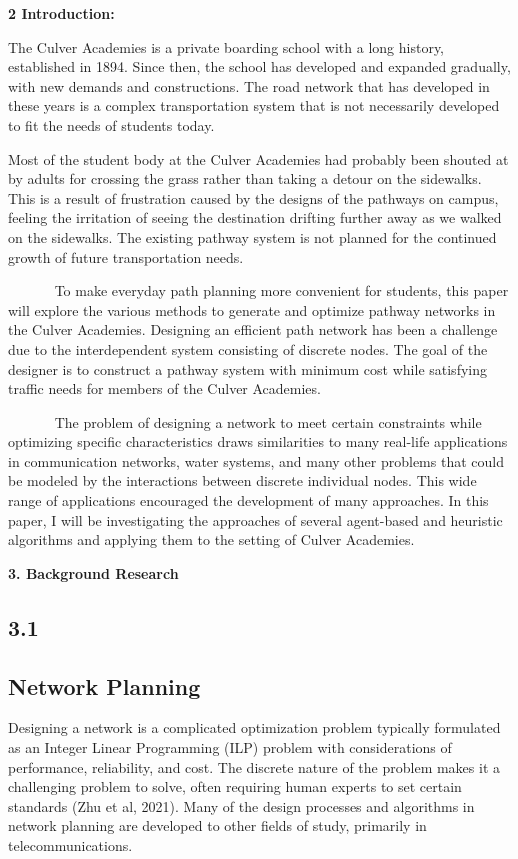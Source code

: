 \documentclass[11pt]{article}
\begin{document}
\textbf{2 Introduction:}

The Culver Academies is a private boarding school with a long history,
established in 1894. Since then, the school has developed and expanded
gradually, with new demands and constructions. The road network that has
developed in these years is a complex transportation system that is not
necessarily developed to fit the needs of students today.

Most of the student body at the Culver Academies had probably been
shouted at by adults for crossing the grass rather than taking a detour
on the sidewalks. This is a result of frustration caused by the designs
of the pathways on campus, feeling the irritation of seeing the
destination drifting further away as we walked on the sidewalks. The
existing pathway system is not planned for the continued growth of
future transportation needs.

~~~~~~ To make everyday path planning more convenient for students, this
paper will explore the various methods to generate and optimize pathway
networks in the Culver Academies. Designing an efficient path network
has been a challenge due to the interdependent system consisting of
discrete nodes. The goal of the designer is to construct a pathway
system with minimum cost while satisfying traffic needs for members of
the Culver Academies.

~~~~~~ The problem of designing a network to meet certain constraints
while optimizing specific characteristics draws similarities to many
real-life applications in communication networks, water systems, and
many other problems that could be modeled by the interactions between
discrete individual nodes. This wide range of applications encouraged
the development of many approaches. In this paper, I will be
investigating the approaches of several agent-based and heuristic
algorithms and applying them to the setting of Culver Academies.

\textbf{3. Background Research}

\subsection{3.1} \subsection{Network Planning}

Designing a network is a complicated optimization problem typically
formulated as an Integer Linear Programming (ILP) problem with
considerations of performance, reliability, and cost. The discrete
nature of the problem makes it a challenging problem to solve, often
requiring human experts to set certain standards (Zhu et al, 2021). Many
of the design processes and algorithms in network planning are developed
to other fields of study, primarily in telecommunications.
\end{document}
